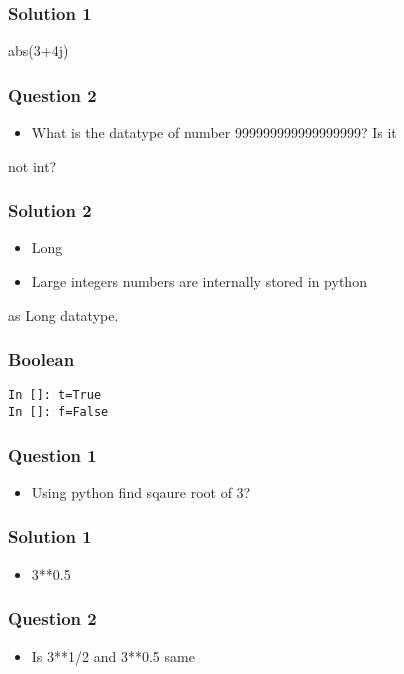 \documentclass[presentation]{beamer}
\begin{document}
\begin{frame}
\frametitle{Solution 1}
\label{sec-4}


        abs(3+4j)
\end{frame}
\begin{frame}
\frametitle{Question 2}
\label{sec-5}

\begin{itemize}
\item What is the datatype of number 999999999999999999? Is it
\end{itemize}

not int?
\end{frame}
\begin{frame}
\frametitle{Solution 2}
\label{sec-6}

        
\begin{itemize}
\item Long
\item Large integers numbers are internally stored in python
\end{itemize}

        as Long datatype.  
\end{frame}
\begin{frame}[fragile]
\frametitle{Boolean}
\label{sec-7}

\begin{verbatim}
In []: t=True
In []: f=False
\end{verbatim}
\end{frame}
\begin{frame}
\frametitle{Question 1}
\label{sec-8}

\begin{itemize}
\item Using python find sqaure root of 3?
\end{itemize}
\end{frame}
\begin{frame}
\frametitle{Solution 1}
\label{sec-9}


\begin{itemize}
\item 3**0.5
\end{itemize}
\end{frame}
\begin{frame}
\frametitle{Question 2}
\label{sec-10}

\begin{itemize}
\item Is 3**1/2 and 3**0.5 same
\end{itemize}
\end{frame}
\end{document}
